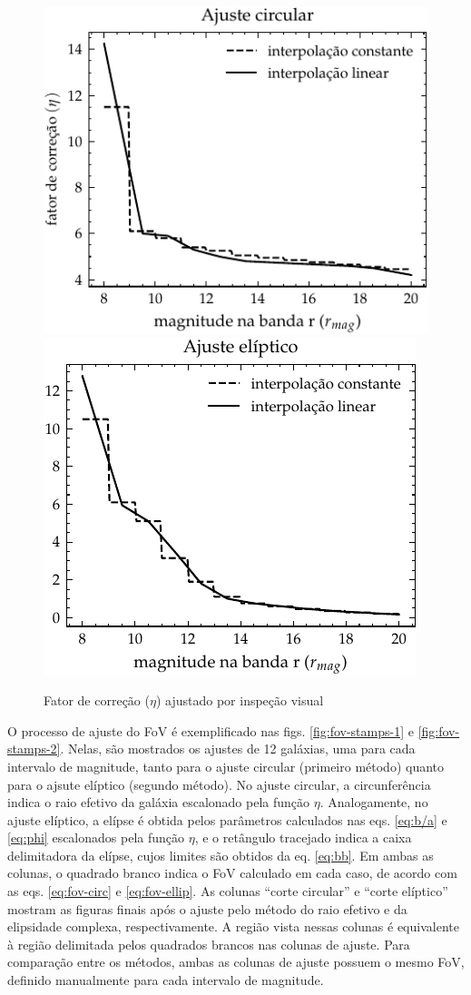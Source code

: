 \begin{figure}[!ht]
  \centering
  \caption{Fator de correção ($\eta$) ajustado por inspeção visual}
  \label{fig:eta}
  \includegraphics[width=0.51\linewidth]{notebooks/plots/correction_factor_circ.pdf}\hfill
  \includegraphics[width=0.48\linewidth]{notebooks/plots/correction_factor_ellip.pdf}
\end{figure}


O processo de ajuste do FoV é exemplificado nas figs. \ref{fig:fov-stamps-1} e \ref{fig:fov-stamps-2}. Nelas, são mostrados os ajustes de 12 galáxias, uma para cada intervalo de magnitude, tanto para o ajuste circular (primeiro método) quanto para o ajsute elíptico (segundo método). No ajuste circular, a circunferência indica o raio efetivo da galáxia escalonado pela função $\eta$. Analogamente, no ajuste elíptico, a elípse é obtida pelos parâmetros calculados nas eqs. \eqref{eq:b/a} e \eqref{eq:phi} escalonados pela função $\eta$, e o retângulo tracejado indica a caixa delimitadora da elípse, cujos limites são obtidos da eq. \eqref{eq:bb}. Em ambas as colunas, o quadrado branco indica o FoV calculado em cada caso, de acordo com as eqs. \eqref{eq:fov-circ} e \eqref{eq:fov-ellip}. As colunas ``corte circular'' e ``corte elíptico'' mostram as figuras finais após o ajuste pelo método do raio efetivo e da elipsidade complexa, respectivamente. A região vista nessas colunas é equivalente à região delimitada pelos quadrados brancos nas colunas de ajuste. Para comparação entre os métodos, ambas as colunas de ajuste possuem o mesmo FoV, definido manualmente para cada intervalo de magnitude.

